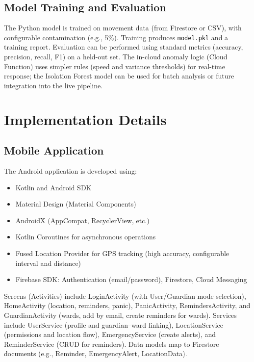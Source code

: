 \documentclass[conference]{IEEEtran}
\begin{document}
\subsection{Model Training and Evaluation}

The Python model is trained on movement data (from Firestore or CSV), with configurable contamination (e.g., 5\%). Training produces \texttt{model.pkl} and a training report. Evaluation can be performed using standard metrics (accuracy, precision, recall, F1) on a held-out set. The in-cloud anomaly logic (Cloud Function) uses simpler rules (speed and variance thresholds) for real-time response; the Isolation Forest model can be used for batch analysis or future integration into the live pipeline.

\section{Implementation Details}

\subsection{Mobile Application}

The Android application is developed using:
\begin{itemize}
    \item Kotlin and Android SDK
    \item Material Design (Material Components)
    \item AndroidX (AppCompat, RecyclerView, etc.)
    \item Kotlin Coroutines for asynchronous operations
    \item Fused Location Provider for GPS tracking (high accuracy, configurable interval and distance)
    \item Firebase SDK: Authentication (email/password), Firestore, Cloud Messaging
\end{itemize}

Screens (Activities) include LoginActivity (with User/Guardian mode selection), HomeActivity (location, reminders, panic), PanicActivity, RemindersActivity, and GuardianActivity (wards, add by email, create reminders for wards). Services include UserService (profile and guardian--ward linking), LocationService (permissions and location flow), EmergencyService (create alerts), and ReminderService (CRUD for reminders). Data models map to Firestore documents (e.g., Reminder, EmergencyAlert, LocationData).
\end{document}
